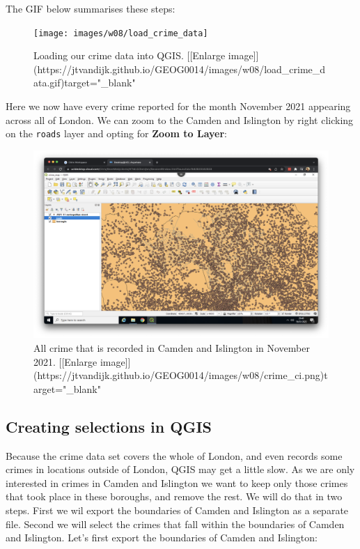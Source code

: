 \documentclass[
]{book}
\begin{document}
The GIF below summarises these steps:

\begin{figure}

{\centering \texttt{[image: images/w08/load\_crime\_data]} 

}

\caption{Loading our crime data into QGIS. [[Enlarge image]](https://jtvandijk.github.io/GEOG0014/images/w08/load_crime_data.gif){target="_blank"}}\label{fig:load-crime-data}
\end{figure}

Here we now have every crime reported for the month November 2021 appearing across all of London. We can zoom to the Camden and Islington by right clicking on the \texttt{roads} layer and opting for \textbf{Zoom to Layer}:

\begin{figure}

{\centering \includegraphics[width=850pt]{images/w08/crime_ci} 

}

\caption{All crime that is recorded in Camden and Islington in November 2021. [[Enlarge image]](https://jtvandijk.github.io/GEOG0014/images/w08/crime_ci.png){target="_blank"}}\label{fig:crime-ci}
\end{figure}

\hypertarget{creating-selections-in-qgis}{%
\subsection*{Creating selections in QGIS}\label{creating-selections-in-qgis}}

Because the crime data set covers the whole of London, and even records some crimes in locations outside of London, QGIS may get a little slow. As we are only interested in crimes in Camden and Islington we want to keep only those crimes that took place in these boroughs, and remove the rest. We will do that in two steps. First we wil export the boundaries of Camden and Islington as a separate file. Second we will select the crimes that fall within the boundaries of Camden and Islington. Let's first export the boundaries of Camden and Islington:
\end{document}
